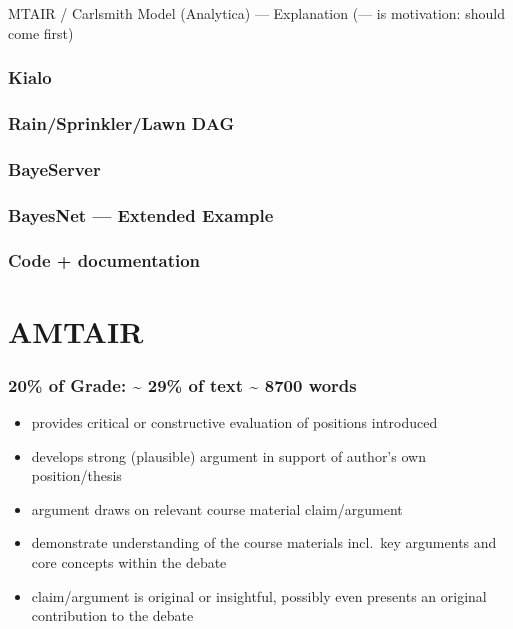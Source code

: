 \documentclass[
  letterpaper,
]{book}
\providecommand{\tightlist}{%
  \setlength{\itemsep}{0pt}\setlength{\parskip}{0pt}}
\begin{document}
MTAIR / Carlsmith Model (Analytica) --- Explanation (--- is motivation:
should come first)

\subsection{Kialo}\label{kialo}

\subsection{Rain/Sprinkler/Lawn DAG}\label{rainsprinklerlawn-dag}

\subsection{BayeServer}\label{bayeserver}

\subsection{BayesNet --- Extended
Example}\label{bayesnet-extended-example}

\subsection{Code + documentation}\label{code-documentation}


\chapter{AMTAIR}\label{amtair}

\subsection{20\% of Grade: \textasciitilde{} 29\% of text
\textasciitilde{} 8700 words}\label{of-grade-29-of-text-8700-words}

\begin{itemize}
\tightlist
\item
  provides critical or constructive evaluation of positions introduced
\item
  develops strong (plausible) argument in support of author's own
  position/thesis
\item
  argument draws on relevant course material claim/argument
\item
  demonstrate understanding of the course materials incl.~key arguments
  and core concepts within the debate
\item
  claim/argument is original or insightful, possibly even presents an
  original contribution to the debate
\end{itemize}
\end{document}
